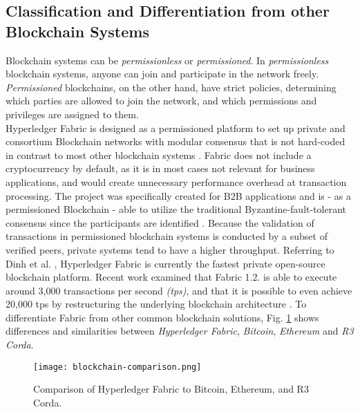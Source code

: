 \subsection{Classification and Differentiation from other Blockchain Systems}
Blockchain systems can be \textit{permissionless} or \textit{permissioned}. In \textit{permissionless} blockchain systems, anyone can join and participate in the network freely. \textit{Permissioned} blockchains, on the other hand, have strict policies, determining which parties are allowed to join the network, and which permissions and privileges are assigned to them. \\
Hyperledger Fabric is designed as a permissioned platform to set up private and consortium Blockchain networks with modular consensus that is not hard-coded in contrast to most other blockchain systems \cite{Vukolic2017}. Fabric does not include a cryptocurrency by default, as it is in most cases not relevant for business applications, and would create unnecessary performance overhead at transaction processing. The project was specifically created for B2B applications and is - as a permissioned Blockchain - able to utilize the traditional Byzantine-fault-tolerant consensus since the participants are identified \cite{Androulaki2018}.
Because the validation of transactions in permissioned blockchain systems is conducted by a subset of verified peers, private systems tend to have a higher throughput. Referring to Dinh et al. \cite{Dinh2017}, Hyperledger Fabric is currently the fastest private open-source blockchain platform.
Recent work examined that Fabric 1.2. is able to execute around 3,000 transactions per second \textit{(tps)}, and that it is possible to even achieve 20,000 tps by restructuring the underlying blockchain architecture \cite{Gorenflo2019a}. To differentiate Fabric from other common blockchain solutions, Fig. \ref{fig:blockchain-comparison} shows differences and similarities between \textit{Hyperledger Fabric}, \textit{Bitcoin}, \textit{Ethereum} and \textit{R3 Corda}. 

\begin{figure}[ht]
	\centering
	\texttt{[image: blockchain-comparison.png]}
	\caption{Comparison of Hyperledger Fabric to Bitcoin, Ethereum, and R3 Corda. }
	\label{fig:blockchain-comparison}
	\vspace{-3mm} %
\end{figure}


